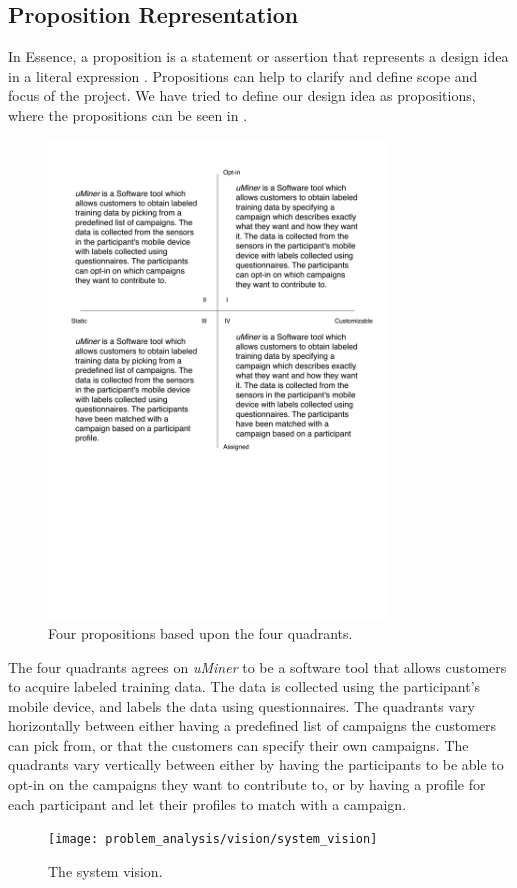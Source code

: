\subsection{Proposition Representation}
\label{sub:proposition_representation}

In Essence, a proposition is a statement or assertion that represents a design idea in a literal expression \parencite{essence_book}. Propositions can help to clarify and define scope and focus of the project. We have tried to define our design idea as propositions, where the propositions can be seen in .

\begin{figure}[!htbp]
	\centering
	\includegraphics[width=0.8\textwidth]{graphic/problem_analysis/vision/propositions.pdf}
	\caption{Four propositions based upon the four quadrants.}
	\label{fig:proposition}
\end{figure}
\FloatBarrier

The four quadrants agrees on \emph{uMiner} to be a software tool that allows customers to acquire labeled training data. The data is collected using the participant's mobile device, and labels the data using questionnaires. The quadrants vary horizontally between either having a predefined list of campaigns the customers can pick from, or that the customers can specify their own campaigns. The quadrants vary vertically between either by having the participants to be able to opt-in on the campaigns they want to contribute to, or by having a profile for each participant and let their profiles to match with a campaign.

\begin{figure}[!htbp]
    \centering
    \texttt{[image: problem\_analysis/vision/system\_vision]}
    \caption{The system vision.}
    \label{fig:system_vision}
\end{figure}
\FloatBarrier